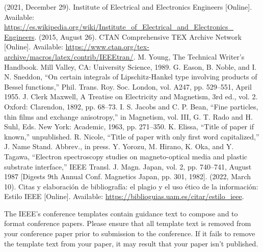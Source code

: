 \documentclass[letterpaper, 10pt, conference]{IEEEtran} %
\begin{document}
	\begin{thebibliography}{00}
		 (2021, December 29). Institute of Electrical and Electronics Engineers [Online]. Available: \href{https://es.wikipedia.org/wiki/Institute_of_Electrical_and_Electronics_Engineers}{https://es.wikipedia.org/wiki/Institute\_of\_Electrical\_and\_Electronics\_ Engineers}.
		 (2015, August 26). CTAN Comprehensive TEX Archive Network [Online]. Available: \href{https://www.ctan.org/tex-archive/macros/latex/contrib/IEEEtran/}{https://www.ctan.org/tex-archive/macros/latex/contrib/IEEEtran/}.
		 M. Young, The Technical Writer's Handbook. Mill Valley, CA: University Science, 1989.
		 G. Eason, B. Noble, and I. N. Sneddon, ``On certain integrals of Lipschitz-Hankel type involving products of Bessel functions,'' Phil. Trans. Roy. Soc. London, vol. A247, pp. 529--551, April 1955.
		 J. Clerk Maxwell, A Treatise on Electricity and Magnetism, 3rd ed., vol. 2. Oxford: Clarendon, 1892, pp. 68--73.
		 I. S. Jacobs and C. P. Bean, ``Fine particles, thin films and exchange anisotropy,'' in Magnetism, vol. III, G. T. Rado and H. Suhl, Eds. New York: Academic, 1963, pp. 271--350.
		 K. Elissa, ``Title of paper if known,'' unpublished.
		 R. Nicole, ``Title of paper with only first word capitalized,'' J. Name Stand. Abbrev., in press.
		 Y. Yorozu, M. Hirano, K. Oka, and Y. Tagawa, ``Electron spectroscopy studies on magneto-optical media and plastic substrate interface,'' IEEE Transl. J. Magn. Japan, vol. 2, pp. 740--741, August 1987 [Digests 9th Annual Conf. Magnetics Japan, pp. 301, 1982].
		 (2022, March 10). Citas y elaboración de bibliografía: el plagio y el uso ético de la información: Estilo IEEE [Online]. Available: \href{https://biblioguias.uam.es/citar/estilo_ieee}{https://biblioguias.uam.es/citar/estilo\_ieee}.
	\end{thebibliography}
	
	\vspace{12pt}
	\color{red}
	The IEEE's conference templates contain guidance text to compose and to format conference papers. Please ensure that all template text is removed from your conference paper prior to submission to the conference. If it fails to remove the template text from your paper, it may result that your paper isn't published.
\end{document}
